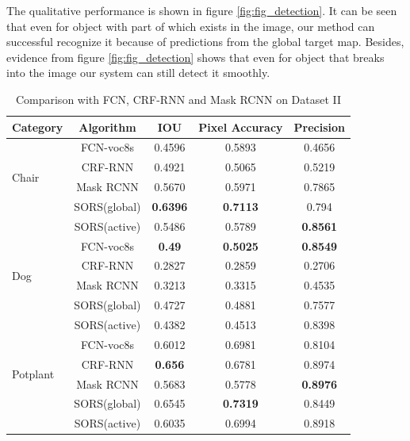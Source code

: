\documentclass[conference]{IEEEtran}
\begin{document}
The qualitative performance is shown in figure \ref{fig:fig_detection}. It can be seen that even for object with part of which exists in the image, our method can successful recognize it because of predictions from the global target map. Besides, evidence from figure \ref{fig:fig_detection} shows that even for object that breaks into the image our system can still detect it smoothly.

\begin{table}[htb]
	\centering
	\normalsize
	\caption{ {\color{blue}Comparison with FCN, CRF-RNN and Mask RCNN on Dataset II}}
	\label{t3}
	\begin{tabular}{lcccc}
		\hline
		Category& Algorithm& IOU& Pixel Accuracy& Precision \\
		\hline
		\multirow {4}{3cm}{Chair}&FCN-voc8s&0.4596&0.5893&0.4656\\
		
		&CRF-RNN&0.4921&0.5065&0.5219\\ 
		&{\color{blue}Mask RCNN}&{\color{blue}0.5670}&{\color{blue} 0.5971} &{\color{blue} 0.7865}  \\
		
		&SORS(global)&\textbf{0.6396}&\textbf{0.7113}&0.794\\
		
		&SORS(active)&0.5486&0.5789&\textbf{0.8561}\\
		\cline{1-5}
		\multirow {4}{3cm}{Dog}&FCN-voc8s&\textbf{0.49}&\textbf{0.5025}&\textbf{0.8549}\\
		
		&CRF-RNN&0.2827&0.2859&0.2706\\
		&{\color{blue}Mask RCNN}&{\color{blue}0.3213}&{\color{blue} 0.3315} &{\color{blue} 0.4535}  \\
		
		&SORS(global)&0.4727&0.4881&0.7577\\
		
		&SORS(active)&0.4382&0.4513&0.8398\\
		\cline{1-5}
		\multirow {4}{3cm}{Potplant}&FCN-voc8s&0.6012&0.6981&0.8104\\
		
		&CRF-RNN&\textbf{0.656}&0.6781&0.8974\\
		&{\color{blue}Mask RCNN}&{\color{blue}0.5683}&{\color{blue} 0.5778} &{\color{blue} \textbf{0.8976}}  \\
		
		&SORS(global)&0.6545&\textbf{0.7319}&0.8449\\
		
		&SORS(active)&0.6035&0.6994&0.8918\\
		\cline{1-5}
	\end{tabular}
\end{table}
\end{document}
